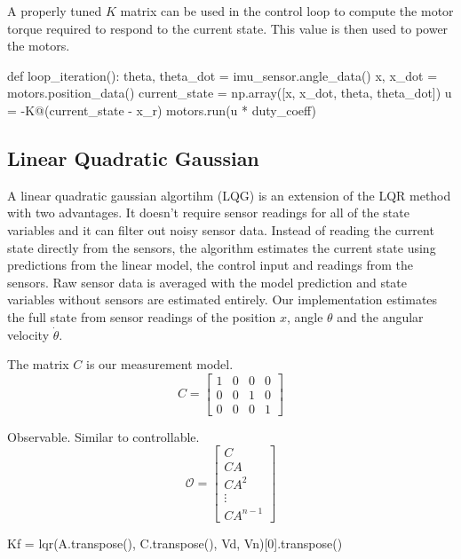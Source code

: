 \documentclass[]{article}
\begin{document}
A properly tuned $K$ matrix can be used in the control loop to compute the motor torque required to respond to the current state.  This value is then used to power the motors.
\vspace{\baselineskip}
\begin{python}
	def loop_iteration():
		theta, theta_dot = imu_sensor.angle_data()
		x, x_dot = motors.position_data()
		current_state = np.array([x, x_dot, theta, theta_dot])
		u = -K@(current_state - x_r)
		motors.run(u * duty_coeff)
\end{python}

\subsection*{Linear Quadratic Gaussian}
A linear quadratic gaussian algortihm (LQG) is an extension of the LQR method with two advantages.  It doesn't require sensor readings for all of the state variables and it can filter out noisy sensor data. Instead of reading the current state directly from the sensors, the algorithm estimates the current state using predictions from the linear model, the control input and readings from the sensors. 
Raw sensor data is averaged with the model prediction and state variables without sensors are estimated entirely. Our implementation estimates the full state from sensor readings  of the position $x$, angle $\theta$ and the angular velocity $\dot{\theta}$. 

The matrix $C$ is our measurement model. 
\begin{equation}
	C = 
	\begin{bmatrix}
		1 & 0 & 0 & 0 \\
		0 & 0 & 1 & 0 \\
		0 & 0 & 0 & 1
	\end{bmatrix}
\end{equation}	

Observable. Similar to controllable.
\begin{equation}
	\mathcal{O} = 
	\begin{bmatrix}
		C \\ CA \\ CA^2 \\ \vdots \\ CA^{n-1}
	\end{bmatrix}
\end{equation}
\vspace{\baselineskip}
\begin{python}
	Kf = lqr(A.transpose(), C.transpose(), Vd, Vn)[0].transpose()
\end{python}
\vspace{\baselineskip}
\end{document}
